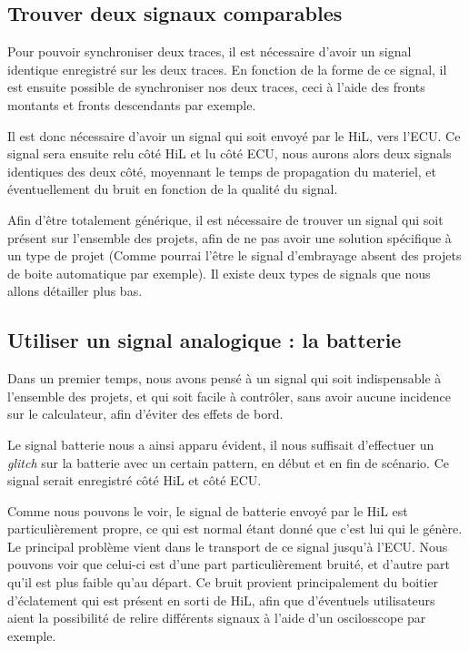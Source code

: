 \subsection{Trouver deux signaux comparables}
Pour pouvoir synchroniser deux traces, il est nécessaire d'avoir un signal identique enregistré sur les deux traces. En fonction de la forme de ce signal, il est ensuite possible de synchroniser nos deux traces, ceci à l'aide des fronts montants et fronts descendants par exemple. 

Il est donc nécessaire d'avoir un signal qui soit envoyé par le HiL, vers l'ECU. Ce signal sera ensuite relu côté HiL et lu côté ECU, nous aurons alors deux signals identiques des deux côté, moyennant le temps de propagation du materiel, et éventuellement du bruit en fonction de la qualité du signal. 



Afin d'être totalement générique, il est nécessaire de trouver un signal qui soit présent sur l'ensemble des projets, afin de ne pas avoir une solution spécifique à un type de projet (Comme pourrai l'être le signal d'embrayage absent des projets de boite automatique par exemple). Il existe deux types de signals que nous allons détailler plus bas. 


\subsection{Utiliser un signal analogique : la batterie}
Dans un premier temps, nous avons pensé à un signal qui soit indispensable à l'ensemble des projets, et qui soit facile à contrôler, sans avoir aucune incidence sur le calculateur, afin d'éviter des effets de bord. 

Le signal batterie nous a ainsi apparu évident, il nous suffisait d'effectuer un \textit{glitch} sur la batterie avec un certain pattern, en début et en fin de scénario. Ce signal serait enregistré côté HiL et côté ECU.


Comme nous pouvons le voir, le signal de batterie envoyé par le HiL est particulièrement propre, ce qui est normal étant donné que c'est lui qui le génère. Le principal problème vient dans le transport de ce signal jusqu'à l'ECU. Nous pouvons voir que celui-ci est d'une part particulièrement bruité, et d'autre part qu'il est plus faible qu'au départ. Ce bruit provient principalement du boitier d'éclatement qui est présent en sorti de HiL, afin que d'éventuels utilisateurs aient la possibilité de relire différents signaux à l'aide d'un oscilosscope par exemple. 

